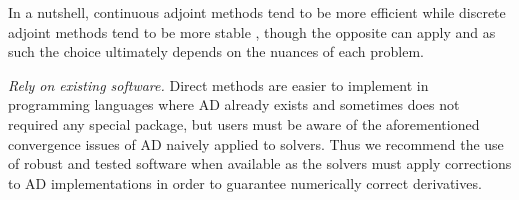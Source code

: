 In a nutshell, continuous adjoint methods tend to be more efficient while discrete adjoint methods tend to be more stable \cite{rackauckas2020universal}, though the opposite can apply and as such the choice ultimately depends on the nuances of each problem.

\vspace{5px}
\noindent\textit{Rely on existing software. }
Direct methods are easier to implement in programming languages where AD already exists and sometimes does not required any special package, but users must be aware of the aforementioned convergence issues of AD naively applied to solvers. 
Thus we recommend the use of robust and tested software when available as the solvers must apply corrections to AD implementations in order to guarantee numerically correct derivatives.



